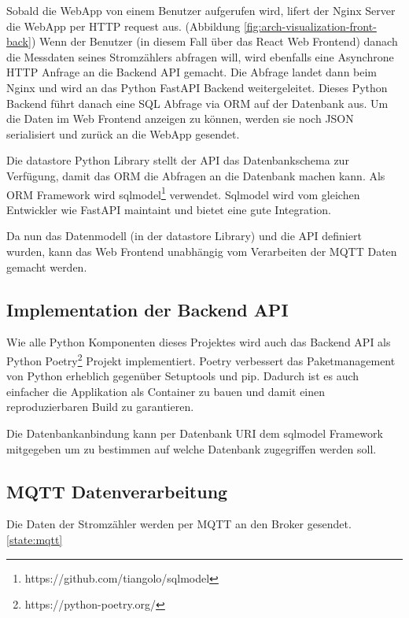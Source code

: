 Sobald die WebApp von einem Benutzer aufgerufen wird, lifert der Nginx Server
die WebApp per \ac{HTTP} request aus. (Abbildung \ref{fig:arch-visualization-front-back})
Wenn der Benutzer (in diesem Fall über das React Web Frontend) danach die Messdaten seines
Stromzählers abfragen will, wird ebenfalls eine Asynchrone \ac{HTTP} Anfrage an die Backend \ac{API} gemacht.
Die Abfrage landet dann beim Nginx und wird an das Python FastAPI Backend weitergeleitet.
Dieses Python Backend führt danach eine SQL Abfrage via \ac{ORM} auf der Datenbank aus.
Um die Daten im Web Frontend anzeigen zu können, werden sie noch \ac{JSON} serialisiert
und zurück an die WebApp gesendet.

Die datastore Python Library stellt der \ac{API} das Datenbankschema zur Verfügung,
damit das \ac{ORM} die Abfragen an die Datenbank machen kann.
Als \ac{ORM} Framework wird sqlmodel\footnote{https://github.com/tiangolo/sqlmodel} verwendet.
Sqlmodel wird vom gleichen Entwickler wie FastAPI maintaint und bietet eine gute Integration.

Da nun das Datenmodell (in der datastore Library) und die \ac{API} definiert wurden,
kann das Web Frontend unabhängig vom Verarbeiten der \ac{MQTT} Daten gemacht werden.

\subsection{Implementation der Backend \ac{API}}

Wie alle Python Komponenten dieses Projektes wird auch das Backend \ac{API}
als Python Poetry\footnote{https://python-poetry.org/} Projekt implementiert.
Poetry verbessert das Paketmanagement von Python erheblich gegenüber Setuptools
und pip. \cite{python_poetry}
Dadurch ist es auch einfacher die Applikation als Container zu bauen und
damit einen reproduzierbaren Build zu garantieren.

Die Datenbankanbindung kann per Datenbank \ac{URI} dem sqlmodel Framework
mitgegeben um zu bestimmen auf welche Datenbank zugegriffen werden soll.



\subsection{\ac{MQTT} Datenverarbeitung}

Die Daten der Stromzähler werden per \ac{MQTT} an den Broker gesendet. \ref{state:mqtt}


